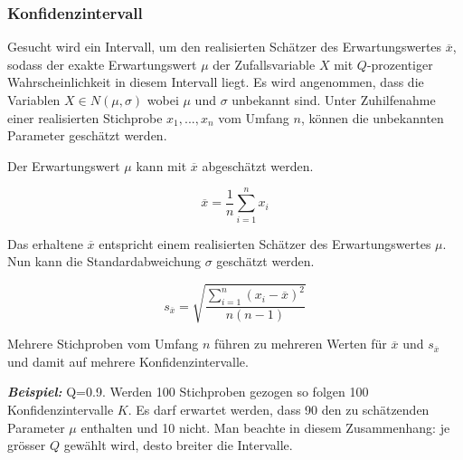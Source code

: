 \subsubsection{ Konfidenzintervall}
\label{sec:3 ergebnisse}

Gesucht wird ein Intervall, um den realisierten Schätzer des Erwartungswertes $\overline x$, sodass der exakte Erwartungswert $\mu$ der Zufallsvariable 
$X$ mit $Q$-prozentiger Wahrscheinlichkeit in diesem Intervall liegt. 
Es wird angenommen, dass die Variablen $X \in N (\mu,\sigma)$ wobei $\mu$ und $\sigma$ unbekannt sind.
Unter Zuhilfenahme einer realisierten Stichprobe $x_{1},...,x_{n}$ vom Umfang $n$, können die unbekannten Parameter geschätzt werden.

\vspace{0.3cm}


Der Erwartungswert $\mu$ kann mit $\overline x$ abgeschätzt werden.

\vspace{0.3cm}

\begin{equation}
\overline x = \frac 1 n  \sum_{i=1}^{n} x_{i}
\end{equation} 

\vspace{0.3cm}

Das erhaltene $\overline x$ entspricht einem realisierten Schätzer des Erwartungswertes $\mu$. 
Nun kann die Standardabweichung $\sigma$ geschätzt werden.

\vspace{0.3cm}

\begin{equation}
s_{\overline x} =\sqrt{ \frac {\sum_{i=1}^{n}(x_{i}-\overline x)^2} {n(n-1)} } 
\end{equation}

\vspace{0.3cm}

Mehrere Stichproben vom Umfang $n$ führen zu mehreren Werten für $\overline x$ und $s_{\overline x}$ und damit auf mehrere Konfidenzintervalle.

\vspace{0.5cm}

\begin{graybox}
\textbf{\textit{Beispiel:}} Q=0.9. Werden 100 Stichproben gezogen so folgen 100 Konfidenzintervalle $K$. Es darf erwartet werden, dass 90 den zu schätzenden
Parameter $\mu$ enthalten und 10  nicht. Man beachte in diesem Zusammenhang: je grösser $Q$ gewählt wird, desto breiter die Intervalle\cite{bachhiesl2}.
\end{graybox}



